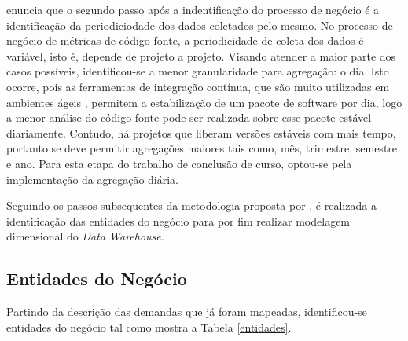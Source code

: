  enuncia que o segundo passo após a indentificação do processo de negócio é a identificação da periodiciodade dos dados coletados pelo mesmo. No processo de negócio de métricas de código-fonte, a periodicidade de coleta dos dados é variável, isto é, depende de projeto a projeto. Visando atender a maior parte dos casos possíveis, identificou-se a menor granularidade para agregação: o dia. Isto ocorre, pois as ferramentas de integração contínua, que são muito utilizadas em ambientes ágeis \cite{beckarticle1999}, permitem a estabilização de um pacote de software por dia, logo a menor análise do código-fonte pode ser realizada sobre esse pacote estável diariamente. Contudo, há projetos que liberam versões estáveis com mais tempo, portanto se deve permitir agregações maiores tais como, mês, trimestre, semestre e ano. Para esta etapa do trabalho de conclusão de curso, optou-se pela implementação da agregação diária.


Seguindo os passos subsequentes da metodologia proposta por , é realizada a identificação das entidades do negócio para por fim realizar modelagem dimensional do \textit{Data Warehouse}. 


\subsection{Entidades do Negócio}

Partindo da descrição das demandas que já foram mapeadas, identificou-se entidades do negócio tal como mostra a Tabela \ref{entidades}.


